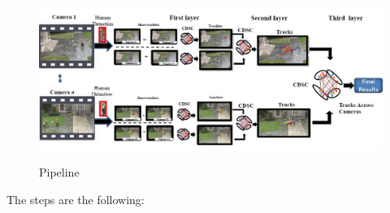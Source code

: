 \begin{figure}[h!]
    \centering
    \includegraphics[scale = 1.4]{img/camera6.jpg}
    \label{camera6}
    \caption{Pipeline}
\end{figure}

The steps are the following:


